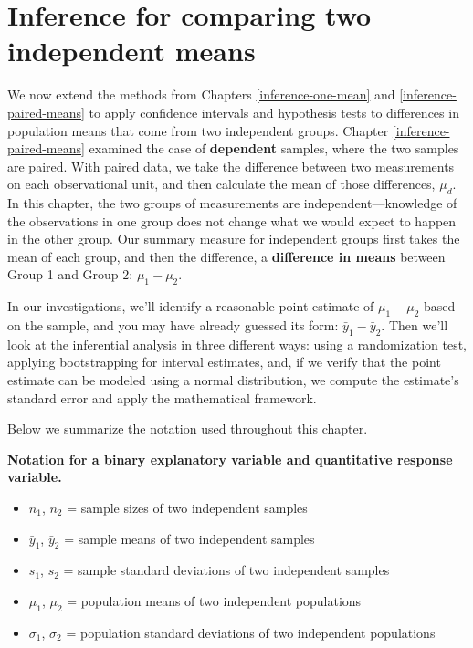 \documentclass[
  10pt,
  openany]{book}
\providecommand{\tightlist}{%
  \setlength{\itemsep}{0pt}\setlength{\parskip}{0pt}}
\theoremstyle{definition}
\theoremstyle{definition}
\theoremstyle{definition}
\theoremstyle{definition}
\theoremstyle{remark}
\begin{document}
\chapter{Inference for comparing two independent means}\label{inference-two-means}

We now extend the methods from Chapters \ref{inference-one-mean} and \ref{inference-paired-means} to apply confidence intervals and hypothesis tests to differences in population means that come from two independent groups.
Chapter \ref{inference-paired-means} examined the case of \textbf{dependent} samples, where the two samples are paired. With paired data, we take the difference between two measurements on each observational unit, and then calculate the mean of those differences, \(\mu_d\).
In this chapter, the two groups of measurements are independent---knowledge of the observations in one group does not change what we would expect to happen in the other group. Our summary measure for independent groups first takes the mean of each group, and then the difference, a \textbf{difference in means} between Group 1 and Group 2: \(\mu_1 - \mu_2.\)

In our investigations, we'll identify a reasonable point estimate of \(\mu_1 - \mu_2\) based on the sample, and you may have already guessed its form: \(\bar{y}_1 - \bar{y}_2.\)  Then we'll look at the inferential analysis in three different ways: using a randomization test, applying bootstrapping for interval estimates, and, if we verify that the point estimate can be modeled using a normal distribution, we compute the estimate's standard error and apply the mathematical framework.

Below we summarize the notation used throughout this chapter.

\textbf{Notation for a binary explanatory variable and quantitative response variable.}

\begin{itemize}
\tightlist
\item
  \(n_1\), \(n_2\) = sample sizes of two independent samples
\item
  \(\bar{y}_1\), \(\bar{y}_2\) = sample means of two independent samples
\item
  \(s_1\), \(s_2\) = sample standard deviations of two independent samples
\item
  \(\mu_1\), \(\mu_2\) = population means of two independent populations
\item
  \(\sigma_1\), \(\sigma_2\) = population standard deviations of two independent populations
\end{itemize}
\end{document}
